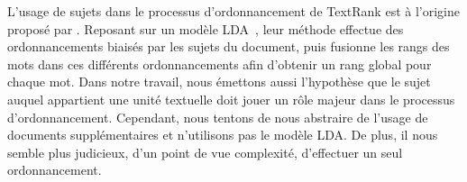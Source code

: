     L'usage de sujets dans le processus d'ordonnancement de TextRank est à
    l'origine proposé par . Reposant sur un
    modèle LDA~\cite[Latent Dirichlet Allocation]{blei2003lda}, leur méthode
    effectue des ordonnancements biaisés par les sujets du document, puis
    fusionne les rangs des mots dans ces différents ordonnancements afin
    d'obtenir un rang global pour chaque mot. Dans notre travail, nous émettons
    aussi l'hypothèse que le sujet auquel appartient une unité textuelle doit
    jouer un rôle majeur dans le processus d'ordonnancement. Cependant, nous
    tentons de nous abstraire de l'usage de documents supplémentaires et
    n'utilisons pas le modèle LDA. De plus, il nous semble plus judicieux, d'un
    point de vue complexité, d'effectuer un seul ordonnancement.

